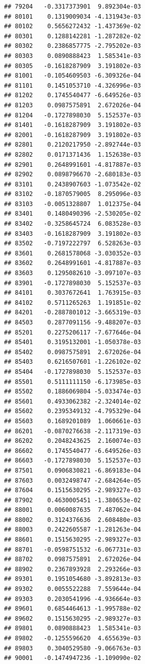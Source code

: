 \documentclass[ignorenonframetext,]{beamer}
\begin{document}
\begin{frame}[fragile]
\begin{verbatim}
## 79204   -0.3317373901  9.892304e-03
## 80101    0.1319009034 -4.131943e-03
## 80102    0.5656272432 -1.437369e-02
## 80301    0.1288142281 -1.287282e-02
## 80302    0.2386857775 -2.795202e-03
## 80303    0.0890888423  1.585341e-03
## 80305   -0.1618287909  3.191802e-03
## 81001   -0.1054609503 -6.309326e-04
## 81101    0.1451053710 -4.326996e-03
## 81202    0.1745540477 -6.649526e-03
## 81203    0.0987575891  2.672026e-04
## 81204   -0.1727898030  5.152537e-03
## 81401   -0.1618287909  3.191802e-03
## 82001   -0.1618287909  3.191802e-03
## 82801    0.2120217950 -2.892744e-03
## 82802    0.0171371436  1.152638e-03
## 82901    0.2648991601 -4.817887e-03
## 82902    0.0898796670 -2.680183e-03
## 83101    0.2438907603 -1.073542e-02
## 83102   -0.1870579005  8.295096e-03
## 83103   -0.0051328807  1.012375e-04
## 83401    0.1480490396 -2.530205e-02
## 83402   -0.3258645724  6.083528e-03
## 83403   -0.1618287909  3.191802e-03
## 83502   -0.7197222797  6.528263e-03
## 83601    0.2681578068 -3.030352e-03
## 83602    0.2648991601 -4.817887e-03
## 83603    0.1295082610 -3.097107e-03
## 83901   -0.1727898030  5.152537e-03
## 84101    0.3037672641  1.763915e-03
## 84102    0.5711265263  1.191851e-02
## 84201   -0.2887801012 -3.665319e-03
## 84503    0.2877091156 -9.488207e-03
## 85201    0.2275206117 -7.677646e-04
## 85401    0.3195132001 -1.050378e-03
## 85402    0.0987575891  2.672026e-04
## 85403    0.6216507601 -1.226102e-02
## 85404   -0.1727898030  5.152537e-03
## 85501    0.5111111150 -6.173985e-03
## 85502    0.1886069804 -5.033474e-03
## 85601    0.4933062382 -2.324014e-02
## 85602    0.2395349132 -4.795329e-04
## 85603    0.1689201089  1.060661e-03
## 86201   -0.0870276638 -2.117319e-03
## 86202    0.2048243625  2.160074e-03
## 86602    0.1745540477 -6.649526e-03
## 86603   -0.1727898030  5.152537e-03
## 87501    0.0906830821 -6.869183e-04
## 87603    0.0032498747 -2.684264e-05
## 87604    0.1515630295 -2.989327e-03
## 87902    0.4630005451 -1.380653e-02
## 88001    0.0060087635  7.487062e-04
## 88002    0.3124376636  2.608480e-03
## 88003    0.2422605587 -1.281263e-04
## 88601    0.1515630295 -2.989327e-03
## 88701   -0.0598751532 -6.067731e-03
## 88702    0.0987575891  2.672026e-04
## 88902    0.2367893928  2.293266e-03
## 89301    0.1951054680 -3.892813e-03
## 89302    0.0055522288  7.559644e-04
## 89303    0.2030541996 -4.936664e-03
## 89601    0.6854464613 -1.995788e-02
## 89602    0.1515630295 -2.989327e-03
## 89801    0.0890888423  1.585341e-03
## 89802   -0.1255596620  4.655639e-03
## 89803    0.3040529580 -9.066763e-03
## 90001   -0.1474947236 -1.109090e-02

\end{verbatim}
\end{frame}
\end{document}
